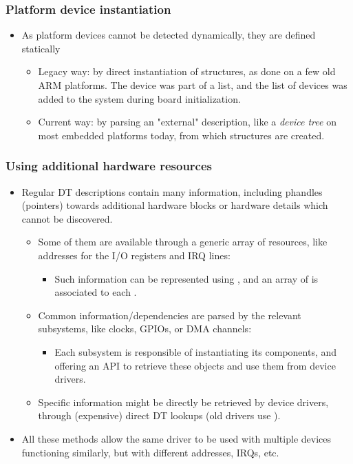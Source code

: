 \begin{frame}[fragile]
  \frametitle{Platform device instantiation}
  \begin{itemize}
  \item As platform devices cannot be detected dynamically, they are
    defined statically
    \begin{itemize}
    \item Legacy way: by direct instantiation of 
      structures, as done on a few old ARM platforms. The device was
      part of a list, and the list of devices was added to the system
      during board initialization.
    \item Current way: by parsing an "external" description, like a
      \emph{device tree} on most embedded platforms today, from which
       structures are created.
    \end{itemize}
  \end{itemize}
\end{frame}

\begin{frame}
  \frametitle{Using additional hardware resources}
  \begin{itemize}
  \item Regular DT descriptions contain many information, including
    phandles (pointers) towards additional hardware blocks or hardware
    details which cannot be discovered.
    \begin{itemize}
    \item Some of them are available through a generic array of resources,
      like addresses for the I/O registers and IRQ lines:
      \begin{itemize}
      \item Such information can be represented using ,
        and an array of  is associated to each
        .
      \end{itemize}
    \item Common information/dependencies are parsed by the relevant
      subsystems, like clocks, GPIOs, or DMA channels:
      \begin{itemize}
      \item Each subsystem is responsible of instantiating its
        components, and offering an API to retrieve these objects and
        use them from device drivers.
      \end{itemize}
    \item Specific information might be directly be retrieved by
      device drivers, through (expensive) direct DT lookups (old drivers
      use ).
    \end{itemize}
  \item All these methods allow the same driver to be used with
    multiple devices functioning similarly, but with different
    addresses, IRQs, etc.
  \end{itemize}
\end{frame}

